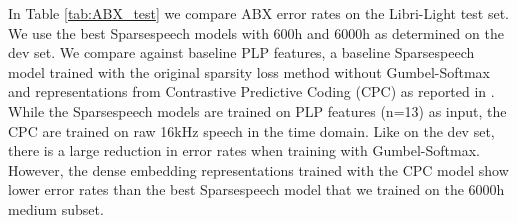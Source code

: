\documentclass[a4paper]{article}
\begin{document}
\begin{table}[th]
  \caption{ABX error on features/posteriograms generated by our model for the Libri-Light test set. CPC results are taken from \cite{kahn2019libri}.}
  \label{tab:ABX_test}
  \centering
\end{table}



In Table \ref{tab:ABX_test} we compare ABX error rates on the Libri-Light test set. We use the best Sparsespeech models with 600h and 6000h as determined on the dev set. We compare against baseline PLP features, a baseline Sparsespeech model trained with the original sparsity loss method without Gumbel-Softmax and representations from Contrastive Predictive Coding (CPC) \cite{oord2018representation} as reported in \cite{kahn2019libri}. While the Sparsespeech models are trained on PLP features (n=13) as input, the CPC are trained on raw 16kHz speech in the time domain. Like on the dev set, there is a large reduction in error rates when training with Gumbel-Softmax. However, the dense embedding representations trained with the CPC model show lower error rates than the best Sparsespeech model that we trained on the 6000h medium subset.
\end{document}
